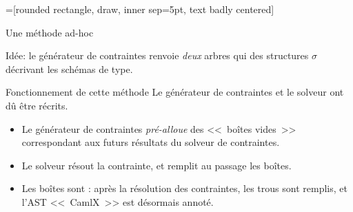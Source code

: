\documentclass[final]{beamer}
\begin{document}
=[rounded rectangle, draw,
        inner sep=5pt,
        text badly centered]

\newcommand{\redsigma}{\ensuremath{\red{\boldsymbol\sigma}}}

\begin{frame}{Une méthode ad-hoc}
  \begin{center}
    \footnotesize
  \end{center}
  Idée: le générateur de contraintes renvoie \emph{deux} arbres qui
  \emph{} des structures $\sigma$ décrivant les schémas de type.
\end{frame}

\begin{frame}{Fonctionnement de cette méthode}
  Le générateur de contraintes et le solveur ont dû être récrits.
  \begin{itemize}
    \item Le générateur de contraintes \emph{pré-alloue} des <<~boîtes vides~>>
      correspondant aux futurs résultats du solveur de contraintes.
    \item Le solveur résout la contrainte, et remplit au passage les boîtes.
    \item Les boîtes sont \underline{}: après la résolution des
      contraintes, les trous sont remplis, et l'AST <<~CamlX~>> est désormais annoté.
  \end{itemize}
\end{frame}
\end{document}
